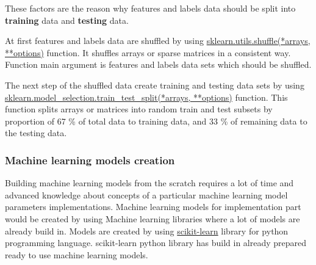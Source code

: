 These factors are the reason why features and labels data should be split into \textbf{training} data and \textbf{testing} data. 

At first features and labels data are shuffled by using \href{https://scikit-learn.org/stable/modules/generated/sklearn.utils.shuffle.html}{sklearn.utils.shuffle(*arrays, **options)} function. It shuffles arrays or sparse matrices in a consistent way. Function main argument is features and labels data sets which should be shuffled.


The next step of the shuffled data create training and testing data sets by using \href{https://scikit-learn.org/stable/modules/generated/sklearn.model_selection.train_test_split.html}{sklearn.model_selection.train_test_split(*arrays, **options)} function. This function splits arrays or matrices into random train and test subsets by proportion of 67 \% of total data to training data, and 33 \% of remaining data to the testing data.  


\subsubsection{Machine learning models creation}


Building machine learning models from the scratch requires a lot of time and advanced knowledge about concepts of a particular machine learning model parameters implementations. Machine learning models for implementation part would be created by using Machine learning libraries where a lot of models are already build in. Models are created by using \href{https://scikit-learn.org/stable/}{scikit-learn}  library for python programming language. scikit-learn python library has build in already prepared ready to use machine learning models.


